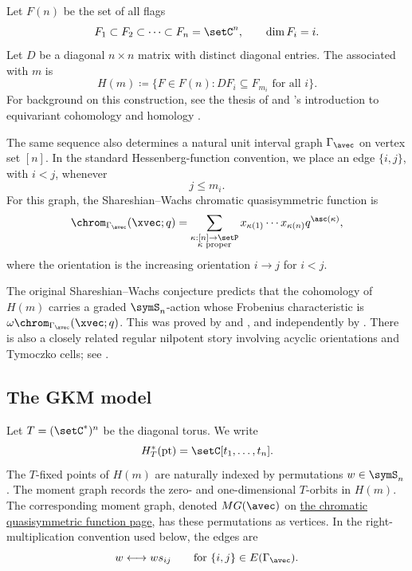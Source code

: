 Let $F(n)$ be the set of all flags
\[
F_1\subset F_2\subset \dotsb \subset F_n=\setC^n,
\qquad
\dim F_i=i.
\]
Let $D$ be a diagonal $n\times n$ matrix with distinct diagonal entries.
The 
\label{regularSemisimpleHessenbergVariety} associated with $m$ is
\[
H(m)
\coloneqq
\{F\in F(n):D F_i\subseteq F_{m_i}\text{ for all }i\}.
\]
For background on this construction, see the thesis of 
\cite{Teff2013} and 's introduction to equivariant
cohomology and homology \cite{Tymoczko2005}.

The same sequence also determines a natural unit interval graph
$\Gamma_\avec$ on vertex set $[n]$.  In the standard Hessenberg-function
convention, we place an edge $\{i,j\}$, with $i \lt j$, whenever
\[
j\leq m_i.
\]
For this graph, the Shareshian--Wachs chromatic quasisymmetric function is
\[
\chrom_{\Gamma_\avec}(\xvec;q)
 =
\sum_{\substack{\kappa:[n]\to\setP\\ \kappa \text{ proper}}}
x_{\kappa(1)}\dotsm x_{\kappa(n)}q^{\asc(\kappa)},
\]
where the orientation is the increasing orientation $i\to j$ for $i \lt j$.

The original Shareshian--Wachs conjecture \cite[Conj.~5.3]{ShareshianWachs2012}
predicts that the cohomology of $H(m)$ carries a graded $\symS_n$-action whose
Frobenius characteristic is
$\omega\chrom_{\Gamma_\avec}(\xvec;q)$.  This was proved by
 and  \cite{BrosnanChow2018}, and
independently by  \cite{GuayPaquet2016x}.
There is also a closely related regular nilpotent story involving acyclic
orientations and Tymoczko cells; see \cite{NovelliThibon2024x}.


\subsection[dotActionGKMModel]{The GKM model}

Let $T=(\setC^\ast)^n$ be the diagonal torus.  We write
\[
H_T^\ast(\mathrm{pt})=\setC[t_1,\dotsc,t_n].
\]
The $T$-fixed points of $H(m)$ are naturally indexed by
permutations $w\in\symS_n$.
The moment graph records the zero- and one-dimensional $T$-orbits in $H(m)$.
The corresponding moment graph, denoted $MG(\avec)$ on
\hyperref[chromaticQuasisymmetricMomentGraph]{the chromatic quasisymmetric
function page}, has these permutations as vertices.
In the right-multiplication convention used below, the edges are
\[
w\longleftrightarrow w s_{ij}
\qquad
\text{for }\{i,j\}\in E(\Gamma_\avec).
\]

